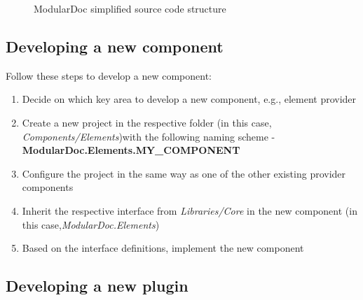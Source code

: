 \begin{figure}[H]
    \caption{ModularDoc simplified source code structure}
    \label{fig:sourceCodeFileStructure}
\end{figure}

\subsection{Developing a new component}

Follow these steps to develop a new component:
\begin{enumerate}
    \item Decide on which key area to develop a new component, e.g., element provider
    \item Create a new project in the respective folder (in this case, \textit{Components/Elements})\linebreak with the following naming scheme - \textbf{ModularDoc.Elements.MY\_COMPONENT}
    \item Configure the project in the same way as one of the other existing provider components
    \item Inherit the respective interface from \textit{Libraries/Core} in the new component (in this case,\linebreak \textit{ModularDoc.Elements})
    \item Based on the interface definitions, implement the new component
\end{enumerate}

\pagebreak
\subsection{Developing a new plugin}


